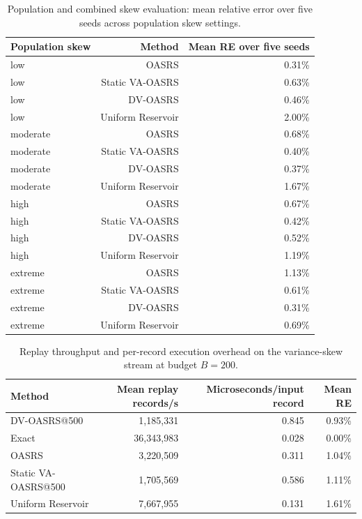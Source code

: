 \documentclass[conference]{IEEEtran}
\begin{document}
\begin{table}[!t]
\centering
\caption{Population and combined skew evaluation: mean relative error over five seeds across population skew settings.}
\label{tab:population_skew}
\small
\begin{tabular}{lrr}
\toprule
\textbf{Population skew} & \textbf{Method} & \textbf{Mean RE over five seeds} \\
\midrule
low & OASRS & 0.31\% \\
low & Static VA-OASRS & 0.63\% \\
low & DV-OASRS & 0.46\% \\
low & Uniform Reservoir & 2.00\% \\
moderate & OASRS & 0.68\% \\
moderate & Static VA-OASRS & 0.40\% \\
moderate & DV-OASRS & 0.37\% \\
moderate & Uniform Reservoir & 1.67\% \\
high & OASRS & 0.67\% \\
high & Static VA-OASRS & 0.42\% \\
high & DV-OASRS & 0.52\% \\
high & Uniform Reservoir & 1.19\% \\
extreme & OASRS & 1.13\% \\
extreme & Static VA-OASRS & 0.61\% \\
extreme & DV-OASRS & 0.31\% \\
extreme & Uniform Reservoir & 0.69\% \\
\bottomrule
\end{tabular}
\end{table}



\begin{table}[!t]
\centering
\caption{Replay throughput and per-record execution overhead on the variance-skew stream at budget $B=200$.}
\label{tab:throughput}
\small
\begin{tabular}{lrrr}
\toprule
\textbf{Method} & \textbf{Mean replay records/s} & \textbf{Microseconds/input record} & \textbf{Mean RE} \\
\midrule
DV-OASRS@500 & 1,185,331 & 0.845 & 0.93\% \\
Exact & 36,343,983 & 0.028 & 0.00\% \\
OASRS & 3,220,509 & 0.311 & 1.04\% \\
Static VA-OASRS@500 & 1,705,569 & 0.586 & 1.11\% \\
Uniform Reservoir & 7,667,955 & 0.131 & 1.61\% \\
\bottomrule
\end{tabular}
\end{table}
\end{document}
